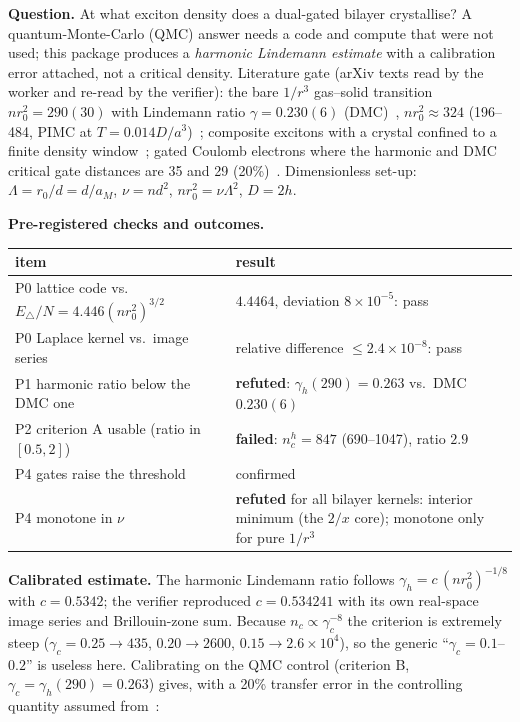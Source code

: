 \documentclass[11pt,a4paper]{article}
\begin{document}
\textbf{Question.} At what exciton density does a dual-gated bilayer crystallise? A quantum-Monte-Carlo (QMC) answer needs a code and
compute that were not used; this package produces a \emph{harmonic Lindemann estimate} with a calibration error attached, not a
critical density. Literature gate (arXiv texts read by the worker and re-read by the verifier): the bare $1/r^3$ gas--solid transition
$n r_0^2=290(30)$ with Lindemann ratio $\gamma=0.230(6)$ (DMC)~\cite{Astrakharchik2007}, $n r_0^2\approx324$ (196--484, PIMC at
$T=0.014D/a^3$)~\cite{Buechler2007}; composite excitons with a crystal confined to a finite density window~\cite{Boening2011}; gated
Coulomb electrons where the harmonic and DMC critical gate distances are 35 and 29 (20\%)~\cite{Valenti2025}.
Dimensionless set-up: $\Lambda=r_0/d=d/a_M$, $\nu=nd^2$, $n r_0^2=\nu\Lambda^2$, $D=2h$.

\textbf{Pre-registered checks and outcomes.}
\begin{center}\small
\begin{tabular}{@{}p{}p{}@{}}
\toprule
item & result \\ \midrule
P0 lattice code vs.\ $E_{\triangle}/N=4.446(nr_0^2)^{3/2}$ & $4.4464$, deviation $8\times10^{-5}$: pass \\
P0 Laplace kernel vs.\ image series & relative difference $\le2.4\times10^{-8}$: pass \\
P1 harmonic ratio below the DMC one & \textbf{refuted}: $\gamma_h(290)=0.263$ vs.\ DMC $0.230(6)$ \\
P2 criterion A usable (ratio in $[0.5,2]$) & \textbf{failed}: $n_c^h=847$ (690--1047), ratio $2.9$ \\
P4 gates raise the threshold & confirmed \\
P4 monotone in $\nu$ & \textbf{refuted} for all bilayer kernels: interior minimum (the $2/x$ core); monotone only for pure $1/r^3$ \\
\bottomrule
\end{tabular}
\end{center}

\textbf{Calibrated estimate.} The harmonic Lindemann ratio follows $\gamma_h=c\,(nr_0^2)^{-1/8}$ with $c=0.5342$; the verifier
reproduced $c=0.534241$ with its own real-space image series and Brillouin-zone sum. Because $n_c\propto\gamma_c^{-8}$ the criterion is
extremely steep ($\gamma_c=0.25\to435$, $0.20\to2600$, $0.15\to2.6\times10^{4}$), so the generic ``$\gamma_c=0.1$--$0.2$'' is useless
here. Calibrating on the QMC control (criterion B, $\gamma_c=\gamma_h(290)=0.263$) gives, with a 20\% transfer error in the
controlling quantity assumed from~\cite{Valenti2025}:
\end{document}
